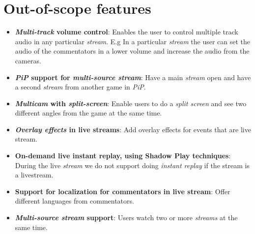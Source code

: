\section{Out-of-scope features}
\begin{itemize}
    \item \textbf{\textit{Multi-track} volume control}: Enables the user to 
    control multiple track audio in any particular \textit{stream}. E.g In a 
    particular \textit{stream} the user can set the audio of the commentators 
    in a lower volume and increase the audio from the cameras.
    \item \textbf{\textit{PiP} support for \textit{multi-source stream}}: Have 
    a main \textit{stream} open and have a second \textit{stream} from another 
    game in \textit{PiP}.
    \item \textbf{\textit{Multicam} with \textit{split-screen}}: Enable users 
    to do a \textit{split screen} and see two different angles from the game at 
    the same time.
    \item \textbf{\textit{Overlay effects} in live streams}: Add overlay 
    effects for events that are live stream.
    \item \textbf{On-demand live instant replay, using Shadow Play techniques}: 
    During the live \textit{stream} we do not support doing \textit{instant 
    replay} if the stream is a livestream.
    \item \textbf{Support for localization for commentators in live stream}: 
    Offer different languages from commentators.
    \item \textbf{\textit{Multi-source stream} support}: Users watch two or more 
    \textit{streams} at the same time.
\end{itemize}